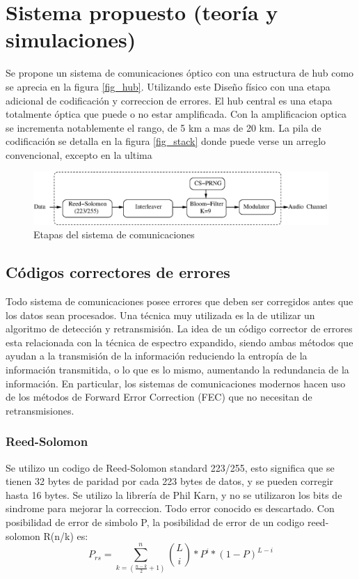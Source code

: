 \chapter{Sistema propuesto (teoría y simulaciones)}

Se propone un sistema de comunicaciones óptico con una estructura de hub como se aprecia en la figura \ref{fig_hub}. Utilizando este Diseño físico con una etapa adicional de codificación y correccion de errores. El hub central es una etapa totalmente óptica que puede o no estar amplificada. Con la amplificacion optica se incrementa notablemente el rango, de 5 km a mas de 20 km.
La pila de codificación se detalla en la figura \ref{fig_stack} donde puede verse un arreglo convencional, excepto en la ultima 

\begin{figure}[t]
\centering
\includegraphics[width=0.9 \textwidth]{Soft-stack2.eps} 
\caption{Etapas del sistema de comunicaciones}
\label{fig_comstack}
\end{figure}

\section{Códigos correctores de errores}

Todo sistema de comunicaciones posee errores que deben ser corregidos antes que los datos sean procesados. Una técnica muy utilizada es la de utilizar un algoritmo de detección y retransmisión.
La idea de un código corrector de errores esta relacionada con la técnica de espectro expandido, siendo ambas métodos que ayudan a la transmisión de la información reduciendo la entropía de la información transmitida, o lo que es lo mismo, aumentando la redundancia de la información. En particular, los sistemas de comunicaciones modernos hacen uso de los métodos de Forward Error Correction (FEC) que no necesitan de retransmisiones.



\subsection{Reed-Solomon}
Se utilizo un codigo de Reed-Solomon standard 223/255, esto significa que se tienen 32 bytes de paridad por cada 223 bytes de datos, y se pueden corregir hasta 16 bytes. Se utilizo la librería de Phil Karn, y no se utilizaron los bits de sindrome para mejorar la correccion. Todo error conocido es descartado.
Con posibilidad de error de simbolo P, la posibilidad de error de un codigo reed-solomon R(n/k) es:
$$P_{rs}= \sum_{k=(\frac{n-k}{2}+1)}^{n} \binom{L}{i} * P^{i} * (1-P)^{L-i} $$

